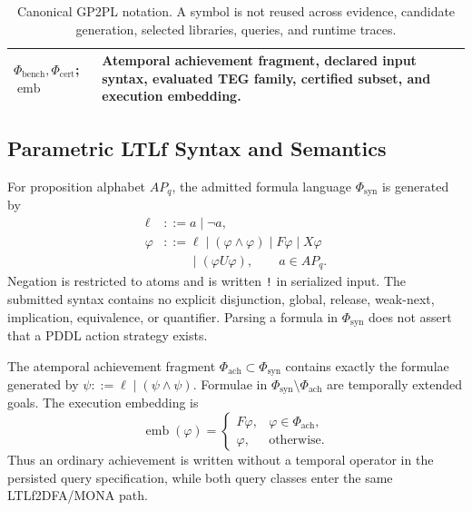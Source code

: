 \begin{table}[htbp]
\begin{tabular}{@{}
>{\raggedright\arraybackslash}p{}
>{\raggedright\arraybackslash}p{}
>{\raggedright\arraybackslash}p{}
>{\raggedright\arraybackslash}p{}@{}}
$\Phi_{\mathrm{bench}},\Phi_{\mathrm{cert}}$; \newline
$\operatorname{emb}$ & Atemporal achievement fragment, declared input syntax,
evaluated TEG family, certified subset, and execution embedding. \\
\bottomrule
\end{tabular}
\caption{Canonical GP2PL notation. A symbol is not reused across evidence,
candidate generation, selected libraries, queries, and runtime traces.}
\label{tab:canonical-notation}
\end{table}
\FloatBarrier

\subsection{Parametric LTLf Syntax and Semantics}

\begin{definition}
For proposition alphabet $AP_q$, the admitted formula language
$\Phi_{\mathrm{syn}}$ is generated by
\[
\begin{aligned}
\ell &::= a\mid\neg a,\\
\varphi &::= \ell\mid(\varphi\land\varphi)\mid F\varphi\mid X\varphi\\
&\phantom{{}::={}}\mid(\varphi U\varphi),\qquad a\in AP_q.
\end{aligned}
\]
Negation is restricted to atoms and is written \textnormal{\texttt{!}} in
serialized input.
The submitted syntax contains no explicit disjunction, global, release,
weak-next, implication, equivalence, or quantifier. Parsing a formula in
$\Phi_{\mathrm{syn}}$ does not assert that a PDDL action strategy exists.

The atemporal achievement fragment $\Phi_{\mathrm{ach}}\subset
\Phi_{\mathrm{syn}}$ contains exactly the formulae generated by
$\psi::=\ell\mid(\psi\land\psi)$. Formulae in
$\Phi_{\mathrm{syn}}\setminus\Phi_{\mathrm{ach}}$ are temporally extended goals.
The execution embedding is
\[
\operatorname{emb}(\varphi)=
\begin{cases}
F\varphi,&\varphi\in\Phi_{\mathrm{ach}},\\
\varphi,&\text{otherwise}.
\end{cases}
\]
Thus an ordinary achievement is written without a temporal operator in the
persisted query specification, while both query classes enter the same
LTLf2DFA/MONA path.
\end{definition}

